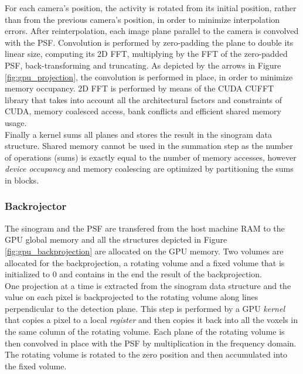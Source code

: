 \documentclass[12pt,a4paper]{report}
\begin{document}
\noindent For each camera's position, the activity is rotated from its initial position, rather than from the previous camera's position, in 
order to minimize interpolation errors. After reinterpolation, each image plane parallel to the camera is convolved with the PSF. 
Convolution is performed by zero-padding the plane to double its linear size, computing its 2D FFT, multiplying by 
the FFT of the zero-padded PSF, back-transforming and truncating. As depicted by the arrows in Figure \ref{fig:gpu_projection}, the 
convolution is performed in place, in order to minimize memory occupancy. 2D FFT is performed by means of the CUDA CUFFT library that takes into account 
all the architectural factors and constraints of CUDA, memory coalesced access, bank conflicts and efficient shared memory usage. \\

\noindent Finally a kernel sums all planes and stores the result in the sinogram data structure. Shared memory cannot be used in the summation step 
as the number of operations (sums) is exactly equal to the number of memory accesses, 
however \textit{device occupancy} and memory coalescing are optimized by partitioning the sums in blocks. \\


\vspace{3mm}
\subsubsection{Backrojector}
The sinogram and the PSF are transfered from the host machine RAM to the GPU global memory and all the structures depicted in 
Figure \ref{fig:gpu_backprojection} are allocated on the GPU memory. Two volumes are allocated for the backprojection, a rotating 
volume and a fixed volume that is initialized to $0$ and contains in the end the result of the backprojection.\\

\noindent One projection at a time is extracted from the sinogram data structure and the value on each pixel is backprojected to 
the rotating volume along lines perpendicular to the detection plane. This step is performed by a GPU \textit{kernel} 
that copies a pixel to a local \textit{register} and then copies it back into all the voxels in the same column of the rotating volume. 
Each plane of the rotating volume is then convolved in place with the PSF by multiplication in the frequency domain. 
The rotating volume is rotated to the zero position and then accumulated into the fixed volume. \\
\end{document}
